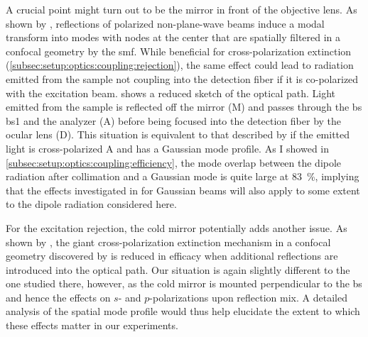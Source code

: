 A crucial point might turn out to be the mirror in front of the objective lens.
As shown by \citet{Benelajla2021}, reflections of polarized non-plane-wave beams induce a modal transform into modes with nodes at the center that are spatially filtered in a confocal geometry by the \gls{smf}.
While beneficial for cross-polarization extinction (\cf \cref{subsec:setup:optics:coupling:rejection}), the same effect could lead to radiation emitted from the sample not coupling into the detection fiber if it is co-polarized with the excitation beam.
 shows a reduced sketch of the optical path.
Light emitted from the sample is reflected off the mirror (M) and passes through the \acrlong{bs} \acrshort{bs}1 and the analyzer (A) before being focused into the detection fiber by the ocular lens (D).
This situation is equivalent to that described by \citet{Benelajla2021} if the emitted light is cross-polarized \wrt A and has a Gaussian mode profile.
As I showed in \cref{subsec:setup:optics:coupling:efficiency}, the mode overlap between the dipole radiation after collimation and a Gaussian  mode is quite large at \qty{83}{\percent}, implying that the effects investigated in  for Gaussian beams will also apply to some extent to the dipole radiation considered here.

For the excitation rejection, the cold mirror potentially adds another issue.
As shown by \citet{Steindl2023}, the giant cross-polarization extinction mechanism in a confocal geometry discovered by \citet{Benelajla2021} is reduced in efficacy when additional reflections are introduced into the optical path.
Our situation is again slightly different to the one studied there, however, as the cold mirror is mounted perpendicular to the \gls{bs} and hence the effects on $s$- and $p$-polarizations upon reflection mix.
A detailed analysis of the spatial mode profile would thus help elucidate the extent to which these effects matter in our experiments.

